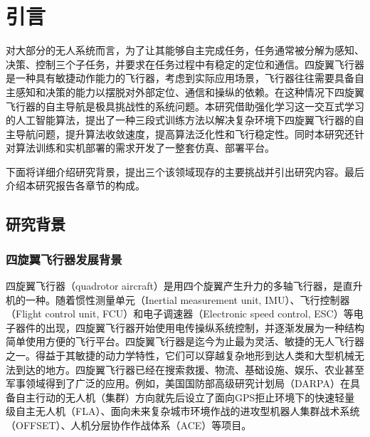 
\chapter{引言}
\label{introduction}
对大部分的无人系统而言，为了让其能够自主完成任务，任务通常被分解为感知、决策、控制三个子任务，并要求在任务过程中有稳定的定位和通信。四旋翼飞行器是一种具有敏捷动作能力的飞行器，考虑到实际应用场景，飞行器往往需要具备自主感知和决策的能力以摆脱对外部定位、通信和操纵的依赖。在这种情况下四旋翼飞行器的自主导航是极具挑战性的系统问题。本研究借助强化学习这一交互式学习的人工智能算法，提出了一种三段式训练方法以解决复杂环境下四旋翼飞行器的自主导航问题，提升算法收敛速度，提高算法泛化性和飞行稳定性。同时本研究还针对算法训练和实机部署的需求开发了一整套仿真、部署平台。

下面将详细介绍研究背景，提出三个该领域现存的主要挑战并引出研究内容。最后介绍本研究报告各章节的构成。

\section{研究背景}
\label{background}
\subsection{四旋翼飞行器发展背景}
四旋翼飞行器（quadrotor aircraft）是用四个旋翼产生升力的多轴飞行器，是直升机的一种。随着惯性测量单元（Inertial measurement unit, IMU）、飞行控制器（Flight control unit, FCU）和电子调速器（Electronic speed control, ESC）等电子器件的出现，四旋翼飞行器开始使用电传操纵系统控制，并逐渐发展为一种结构简单使用方便的飞行平台。四旋翼飞行器是迄今为止最为灵活、敏捷的无人飞行器之一\cite{verbeke2018experimental}\cite{ackermann2020ai}。得益于其敏捷的动力学特性，它们可以穿越复杂地形到达人类和大型机械无法到达的地方。四旋翼飞行器已经在搜索救援、物流、基础设施、娱乐、农业甚至军事领域得到了广泛的应用。例如，美国国防部高级研究计划局（DARPA）在具备自主行动的无人机（集群）方向就先后设立了面向GPS拒止环境下的快速轻量级自主无人机（FLA）、面向未来复杂城市环境作战的进攻型机器人集群战术系统（OFFSET）、人机分层协作作战体系（ACE）等项目\cite{darpa2023}。

